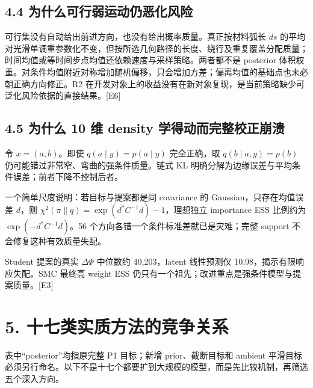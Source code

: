 \documentclass[
  11pt,
  a4paper,
]{article}
\begin{document}
\hypertarget{ux4e3aux4ec0ux4e48ux53efux884cux5f31ux8fd0ux52a8ux4ecdux6076ux5316ux98ceux9669}{%
\subsection{4.4
为什么可行弱运动仍恶化风险}\label{ux4e3aux4ec0ux4e48ux53efux884cux5f31ux8fd0ux52a8ux4ecdux6076ux5316ux98ceux9669}}

可行集没有自动给出前进方向，也没有给出概率质量。真正按材料弧长 \(ds\)
的平均对光滑单调重参数化不变，但按所选几何路径的长度、绕行及重复覆盖分配质量；时间均值或等时间步点均值还依赖速度与采样策略。两者都不是
posterior
体积权重。对条件均值附近对称增加随机偏移，只会增加方差；偏离均值的基础点也未必朝正确方向修正。R2
在开发对象上的收益没有在新对象复现，是当前策略缺少可泛化风险依据的直接结果。{[}E6{]}

\hypertarget{ux4e3aux4ec0ux4e48-10-ux7ef4-density-ux5b66ux5f97ux52a8ux800cux5b8cux6574ux6821ux6b63ux5d29ux6e83}{%
\subsection{4.5 为什么 10 维 density
学得动而完整校正崩溃}\label{ux4e3aux4ec0ux4e48-10-ux7ef4-density-ux5b66ux5f97ux52a8ux800cux5b8cux6574ux6821ux6b63ux5d29ux6e83}}

令 \(x=(a,b)\)。即使 \(q(a\mid y)=p(a\mid y)\) 完全正确，取
\(q(b\mid a,y)=p(b)\) 仍可能错过非常窄、弯曲的强条件质量。链式 KL
明确分解为边缘误差与平均条件误差；前者下降不控制后者。

一个简单尺度说明：若目标与提案都是同 covariance 的
Gaussian，只存在均值误差 \(d\)，则
\(\chi^2(\pi\|q)=\exp(d^*C^{-1}d)-1\)，理想独立 importance ESS 比例约为
\(\exp(-d^*C^{-1}d)\)。56 个方向各错一个条件标准差就已是灾难；完整
support 不会修复这种有效质量失配。

Student 提案的真实 \(\Delta\Phi\) 中位数约 40,203，latent 线性预测仅
10.98，揭示有限响应失配。SMC 最终高 weight ESS
仍只有一个祖先；改进重点是强条件模型与提案质量。{[}E3{]}

\hypertarget{ux5341ux4e03ux7c7bux5b9eux8d28ux65b9ux6cd5ux7684ux7adeux4e89ux5173ux7cfb}{%
\section{5.
十七类实质方法的竞争关系}\label{ux5341ux4e03ux7c7bux5b9eux8d28ux65b9ux6cd5ux7684ux7adeux4e89ux5173ux7cfb}}

表中``posterior''均指原完整 P1 目标；新增 prior、截断目标和 ambient
平滑目标必须另行命名。以下不是十七个都要扩到大规模的模型，而是先比较机制，再筛选五个深入方向。
\end{document}
